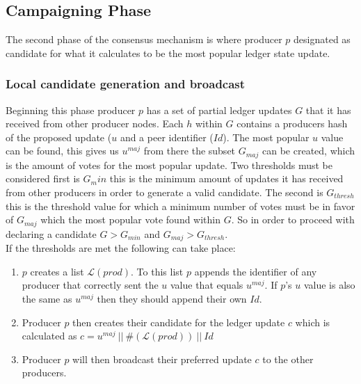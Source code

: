 \documentclass{article}
\begin{document}

\subsection{Campaigning Phase}

The second phase of the consensus mechanism is where producer $p$ designated as candidate for what it calculates to be the most popular ledger state update. \\

\subsubsection{Local candidate generation and broadcast}

Beginning this phase producer $p$ has a set of partial ledger updates $G$ that it has received from other producer nodes. Each $h$ within $G$ contains a producers hash of the proposed update ($u$ and a peer identifier ($Id$). The most popular $u$ value can be found, this gives us $u^{maj}$ from there the subset $G_{maj}$ can be created, which is the amount of votes for the most popular update. Two thresholds must be considered first is $G_min$ this is the minimum amount of updates it has received from other producers in order to generate a valid candidate. The second is $G_{thresh}$ this is the threshold value for which a minimum number of votes must be in favor of $G_{maj}$ which the most popular vote found within $G$.  So in order to proceed with declaring a candidate $G > G_{min}$ and $G_{maj} > G_{thresh}$. \\

If the thresholds are met the following can take place:

\begin{enumerate}
\item $p$ creates a list $\mathcal{L}(prod)$. To this list $p$ appends the identifier of any producer that correctly sent the $u$ value that equals $u^{maj}$. If $p$'s $u$ value is also the same as $u^{maj}$ then they should append their own $Id$.
\item Producer $p$ then creates their candidate for the ledger update $c$ which is calculated as $c = u^{maj}~||~\#(\mathcal{L}(prod))~||~Id$
\item Producer $p$ will then broadcast their preferred update $c$ to the other producers. 
\end{enumerate}
\end{document}
